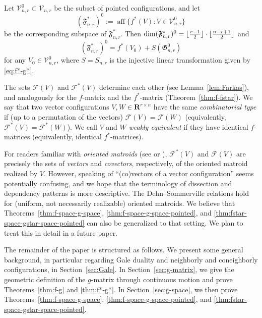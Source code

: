 \documentclass[a4paper,USenglish,cleveref, autoref, thm-restate,nolineno]{socg-lipics-v2021}
\DeclareMathOperator{\aff}{aff}
\newcommand{\fspace}{\mathfrak{F}}
\newcommand{\gspace}{\mathfrak{G}}
\newcommand{\R}{\mathbf{R}}
\DeclarePairedDelimiter\floor{\lfloor}{\rfloor}
\begin{document}
\begin{theorem}
\label{thm:fstar-space-gstar-space-pointed}
Let $\mathcal{V}^0_{n,r} \subset \mathcal{V}_{n,r}$ be the subset of pointed configurations, and let  
\[
(\fspace^*_{n,r})^0:=\aff\{f^*(V)\colon V\in \mathcal{V}^0_{n,r}\}
\]
be the corresponding subspace of $\fspace^*_{n,r}$. Then $\dim (\fspace^*_{n,r})^0=\floor{\frac{r-1}{2}}\cdot \floor{\frac{n-r+1}{2}}$ and
\[ 
(\fspace^*_{n,r})^0=f^*(V_0)+S(\gspace^0_{n,r})
\]
for any $V_0 \in \mathcal{V}^0_{n,r}$, where $S=S_{n,r}$ is the injective linear transformation given by \eqref{eq:f*-g*}.
\end{theorem}
\begin{remark}\label{rem:OM}
The sets $\mathcal{F}(V)$ and $\mathcal{F}^*(V)$ determine each other (see Lemma~\ref{lem:Farkas}), and analogously for the $f$-matrix and the $f^*$-matrix (Theorem~\ref{thm:f-fstar}). We say that two vector configurations $V,W \in \R^{r\times n}$ have the same \emph{combinatorial type} if (up to a permutation of the vectors) $\mathcal{F}(V)=\mathcal{F}(W)$ (equivalently,  $\mathcal{F}^*(V)=\mathcal{F}^*(W)$). We call $V$ and $W$ \emph{weakly equivalent} if they have identical $f$-matrices (equivalently, identical $f^*$-matrices).

For readers familiar with \emph{oriented matroids} (see \cite[Ch.~6]{Ziegler:1995aa} or \cite{Bjorner:1999aa}), $\mathcal{F}^*(V)$ and $\mathcal{F}(V)$ are precisely the sets of \emph{vectors} and \emph{covectors}, respectively, of the oriented matroid realized by $V$. However, speaking of ``(co)vectors of a vector configuration'' seems potentially confusing, and we hope that the terminology of dissection and dependency patterns is more descriptive. The Dehn--Sommerville relations hold for (uniform, not necessarily realizable) oriented matroids. We believe that Theorems~\ref{thm:f-space-g-space}, \ref{thm:f-space-g-space-pointed}, and \ref{thm:fstar-space-gstar-space-pointed} can also be generalized to that setting.
We plan to treat this in detail in a future paper.
\end{remark}
The remainder of the paper is structured as follows. We present some general background, in particular regarding Gale duality and neighborly and coneighborly configurations, in Section~\ref{sec:Gale}. In Section~\ref{sec:g-matrix}, we give the geometric definition of the $g$-matrix through continuous motion and prove Theorems~\ref{thm:f-g} and \ref{thm:f*-g*}. 
In Section~\ref{sec:g-space}, we then prove Theorems~\ref{thm:f-space-g-space}, \ref{thm:f-space-g-space-pointed}, and \ref{thm:fstar-space-gstar-space-pointed}. 
\end{document}
